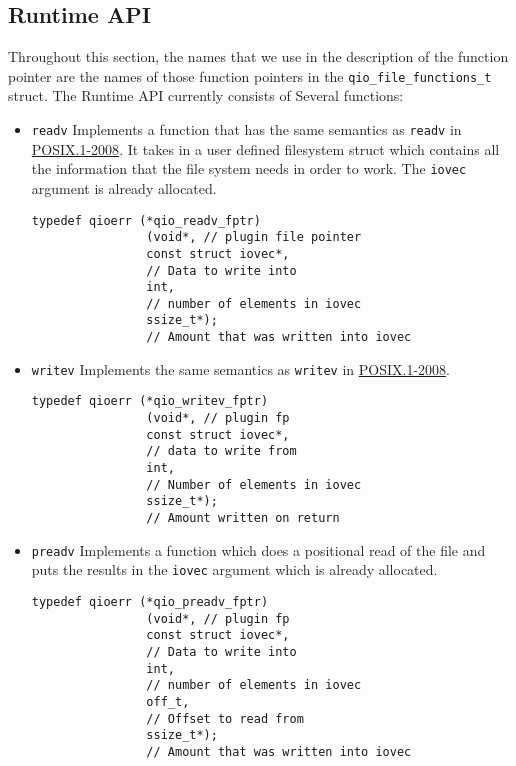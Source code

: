 \subsection{Runtime API}
Throughout this section, the names that we use in the description of the function pointer are the names of those
function pointers in the {\tt qio\_file\_functions\_t} struct.
The Runtime API currently consists of Several functions:
\begin{itemize}
\item {\tt readv} Implements a function that has the same semantics as {\tt readv} in
\href{http://pubs.opengroup.org/onlinepubs/9699919799/}{POSIX.1-2008}. It takes
in a user defined filesystem struct which contains all the information that the file system needs
in order to work. The {\tt iovec} argument is already allocated.
\begin{lstlisting}
typedef qioerr (*qio_readv_fptr)
                (void*, // plugin file pointer
                const struct iovec*,   
                // Data to write into
                int,                    
                // number of elements in iovec
                ssize_t*);              
                // Amount that was written into iovec
\end{lstlisting}
\item {\tt writev} Implements the same semantics as {\tt writev} in
\href{http://pubs.opengroup.org/onlinepubs/9699919799/}{POSIX.1-2008}. 
\begin{lstlisting}
typedef qioerr (*qio_writev_fptr) 
                (void*, // plugin fp
                const struct iovec*,      
                // data to write from
                int,                      
                // Number of elements in iovec
                ssize_t*);                
                // Amount written on return
\end{lstlisting}
\item {\tt preadv} Implements a function which does a positional read of the file 
and puts the results in the {\tt iovec} argument which is already allocated. 
\begin{lstlisting}
typedef qioerr (*qio_preadv_fptr) 
                (void*, // plugin fp
                const struct iovec*,      
                // Data to write into
                int,                      
                // number of elements in iovec
                off_t,                    
                // Offset to read from
                ssize_t*);                
                // Amount that was written into iovec

\end{lstlisting}
\end{itemize}
